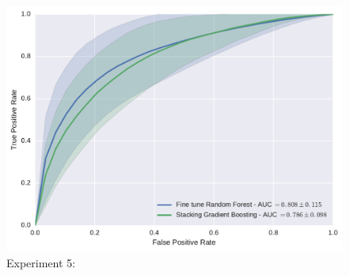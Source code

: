 \begin{figure}
  \centering
  \includegraphics[width=0.7\linewidth]{6_pipeline/figures/exp-5/combine_all.pdf}
  \caption{Experiment 5:}
  \label{fig:}
\end{figure}
